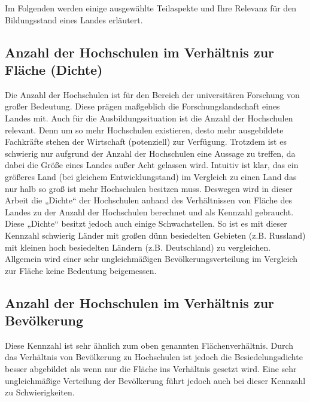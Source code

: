 Im Folgenden werden einige ausgewählte Teilaspekte und Ihre Relevanz für den Bildungsstand eines Landes erläutert.

\subsection{Anzahl der Hochschulen im Verhältnis zur Fläche (Dichte)}
Die Anzahl der Hochschulen ist für den Bereich der universitären Forschung von großer Bedeutung. Diese prägen maßgeblich die Forschungslandschaft eines Landes mit. Auch für die Ausbildungssituation ist die Anzahl der Hochschulen relevant. Denn um so mehr Hochschulen existieren, desto mehr ausgebildete Fachkräfte stehen der Wirtschaft (potenziell) zur Verfügung. 
Trotzdem ist es schwierig nur aufgrund der Anzahl der Hochschulen eine Aussage zu treffen, da dabei die Größe eines Landes außer Acht gelassen wird. Intuitiv ist klar, das ein größeres Land (bei gleichem Entwicklungstand) im Vergleich zu einen Land das nur halb so groß ist mehr Hochschulen besitzen muss. Deswegen wird in dieser Arbeit die „Dichte“ der Hochschulen anhand des Verhältnissen von  Fläche des Landes zu der Anzahl der Hochschulen berechnet und als Kennzahl gebraucht.
Diese „Dichte“ besitzt jedoch auch einige Schwachstellen. So ist es mit dieser Kennzahl schwierig Länder mit großen dünn besiedelten Gebieten (z.B. Russland) mit kleinen hoch besiedelten Ländern (z.B. Deutschland) zu vergleichen. Allgemein wird einer sehr ungleichmäßigen Bevölkerungsverteilung im Vergleich zur Fläche keine Bedeutung beigemessen.

\subsection{Anzahl der Hochschulen im Verhältnis zur Bevölkerung}
Diese Kennzahl ist sehr ähnlich zum oben genannten Flächenverhältnis. Durch das Verhältnis von Bevölkerung zu Hochschulen ist jedoch die Besiedelungsdichte besser abgebildet als wenn nur die Fläche ins Verhältnis gesetzt wird.
Eine sehr ungleichmäßige Verteilung der Bevölkerung führt jedoch auch bei dieser Kennzahl zu Schwierigkeiten.

